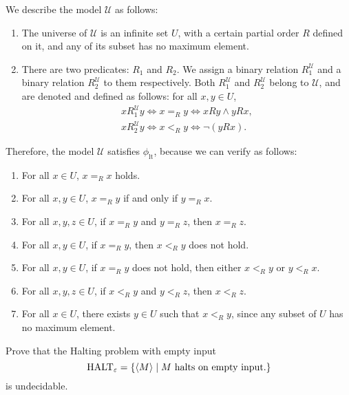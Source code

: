 \documentclass{homework}
\begin{document}
\begin{solution}

  We describe the model $\mathcal{U}$ as follows:
  \begin{enumerate}
    \item The universe of $\mathcal{U}$ is an infinite set $U$,
          with a certain partial order $R$ defined on it,
          and any of its subset has no maximum element.
    \item There are two predicates: $R_1$ and $R_2$.
          We assign a binary relation $R_1^{\mathcal{U}}$
          and a binary relation $R_2^{\mathcal{U}}$ to them respectively.
          Both $R_1^{\mathcal{U}}$ and $R_2^{\mathcal{U}}$ belong to $\mathcal{U}$,
          and are denoted and defined as follows: for all $x, y \in U$,
          \begin{align*}
            xR_1^{\mathcal{U}}y \iff x =_R y \iff xRy \land yRx, \\
            xR_2^{\mathcal{U}}y \iff x <_R y \iff \lnot(yRx).
          \end{align*}
  \end{enumerate}

  Therefore, the model $\mathcal{U}$ satisfies $\phi_{\mathrm{lt}}$,
  because we can verify as follows:
  \begin{enumerate}
    \item For all $x \in U$, $x =_R x$ holds.
    \item For all $x, y \in U$, $x =_R y$ if and only if $y =_R x$.
    \item For all $x, y, z \in U$, if $x =_R y$ and $y =_R z$, then $x =_R z$.
    \item For all $x, y \in U$, if $x =_R y$, then $x <_R y$ does not hold.
    \item For all $x, y \in U$, if $x =_R y$ does not hold, then either $x <_R y$ or $y <_R x$.
    \item For all $x, y, z \in U$, if $x <_R y$ and $y <_R z$, then $x <_R z$.
    \item For all $x \in U$, there exists $y \in U$ such that $x <_R y$,
          since any subset of $U$ has no maximum element.
  \end{enumerate}

\end{solution}

\begin{problem}
  Prove that the Halting problem with empty input
  \begin{equation*}
    \mathrm{HALT}_{\varepsilon} = \{ \langle M \rangle \mid M
    \text{ halts on empty input.}\}
  \end{equation*}
  is undecidable.
\end{problem}
\end{document}
